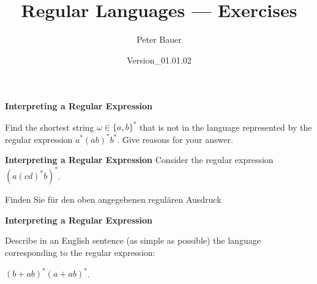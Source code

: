 \documentclass[a4paper]{exam}
\title{Regular Languages --- Exercises}
\author{Peter Bauer}
\date{Version\_01.01.02} %
\theoremstyle{remark}
\begin{document}

\begin{center} 
\end{center}

\begin{questions}
\question
	\textbf{Interpreting a Regular Expression}
	
	Find the shortest string $\omega \in \{a, b\}^*$ that is not in the language represented by the regular expression $a^*(ab)^*b^*$. Give
	reasons for your answer.
	
\question
	\textbf{Interpreting a Regular Expression}
	Consider the regular expression $(a(cd)^*b)^*$.
	
	\begin{otherlanguage}{german}
		Finden Sie für den oben angegebenen regulären Ausdruck
	\end{otherlanguage}
\question
	\textbf{Interpreting a Regular Expression}
	
	Describe in an English sentence (as simple as possible) the language corresponding to the regular expression:
	
	$(b + ab)^*(a + ab)^*$.


\end{questions}
\end{document}
